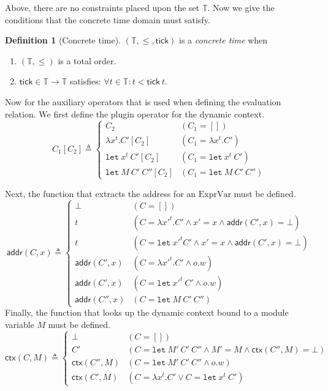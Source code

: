 \documentclass[acmsmall,screen]{acmart}
\theoremstyle{definition}
\newtheorem{definition}{Definition}[section]
\newcommand*{\ExprVar}{\text{ExprVar}}
\newcommand*{\Time}{\mathbb{T}}
\newcommand*{\addr}{\mathsf{addr}}
\newcommand*{\tick}{\mathsf{tick}}
\newcommand*{\modctx}{\mathsf{ctx}}
\newcommand*{\Let}{\mathtt{let}}
\begin{document}
Above, there are no constraints placed upon the set $\Time$.
Now we give the conditions that the concrete time domain must satisfy.

\begin{definition}[Concrete time]
  $(\Time, \le, \tick)$ is a \emph{concrete time} when
  \begin{enumerate}
    \item $(\Time, \le)$ is a total order.
    \item $\tick\in\Time\rightarrow\Time$ satisfies: $\forall t\in\Time: t < \tick\:t$.
  \end{enumerate}
\end{definition}

Now for the auxiliary operators that is used when defining the evaluation relation.
We first define the plugin operator for the dynamic context.
\[
  C_{1}[C_{2}]\triangleq
  \begin{cases}
    C_{2}                           & (C_{1}=[])                       \\
    \lambda x^{t}.C'[C_{2}]         & (C_{1}=\lambda x^{t}.C')         \\
    \mathtt{let}\:x^{t}\:C'[C_{2}]  & (C_{1}=\mathtt{let}\:x^{t}\:C')  \\
    \mathtt{let}\:M\:C'\:C''[C_{2}] & (C_{1}=\mathtt{let}\:M\:C'\:C'')
  \end{cases}
\]

Next, the function that extracts the address for an $\ExprVar$ must be defined.
\[
  \addr(C,x)\triangleq
  \begin{cases}
    \bot         & (C=[])                                                        \\
    t            & (C=\lambda x'^{t}.C'\wedge x'= x\wedge \addr(C',x)=\bot)      \\
    t            & (C=\mathtt{let}\:x'^{t}C'\wedge x'= x\wedge \addr(C',x)=\bot) \\
    \addr(C',x)  & (C=\lambda x'^{t}.C'\wedge o.w)                               \\
    \addr(C',x)  & (C=\mathtt{let}\:x'^{t}\:C'\wedge o.w)                        \\
    \addr(C'',x) & (C=\mathtt{let}\:M\:C'\:C'')
  \end{cases}
\]
Finally, the function that looks up the dynamic context bound to a module variable $M$ must be defined.
\[
  \modctx(C,M)\triangleq
  \begin{cases}
    \bot           & (C=[])                                                             \\
    C'             & (C=\mathtt{let}\:M'\:C'\:C''\wedge M'= M\wedge\modctx(C'',M)=\bot) \\
    \modctx(C'',M) & (C=\mathtt{let}\:M'\:C'\:C''\wedge o.w)                            \\
    \modctx(C',M)  & (C=\lambda x^{t}.C'\lor C=\Let\:x^{t}\:C')
  \end{cases}
\]
\end{document}
